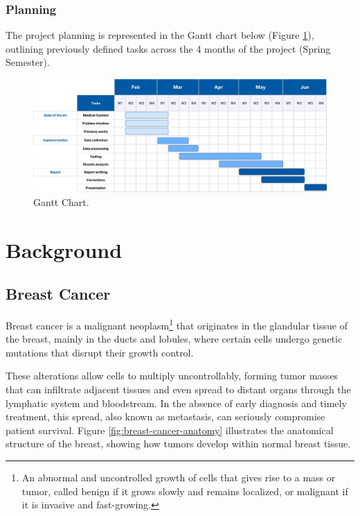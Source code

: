 \documentclass[a4paper,10pt]{book}
\begin{document}
\subsection{Planning}

The project planning is represented in the Gantt chart below (Figure \ref{fig:roadmap}), outlining previously defined tasks across the 4 months of the project (Spring Semester).

\begin{figure}[h!]
	\centering
	\includegraphics[width=1\linewidth]{reports//assets/RoadmapV3.png}
	\caption{Gantt Chart.}
	\label{fig:roadmap}
\end{figure}


\chapter{Background}

\section{Breast Cancer}

Breast cancer is a malignant neoplasm\footnote{An abnormal and uncontrolled growth of cells that gives rise to a mass or tumor, called benign if it grows slowly and remains localized, or malignant if it is invasive and fast-growing.} that originates in the glandular tissue of the breast, mainly in the ducts and lobules, where certain cells undergo genetic mutations that disrupt their growth control. 

These alterations allow cells to multiply uncontrollably, forming tumor masses that can infiltrate adjacent tissues and even spread to distant organs through the lymphatic system and bloodstream. In the absence of early diagnosis and timely treatment, this spread, also known as metastasis, can seriously compromise patient survival. Figure \ref{fig:breast-cancer-anatomy} illustrates the anatomical structure of the breast, showing how tumors develop within normal breast tissue.
\end{document}
